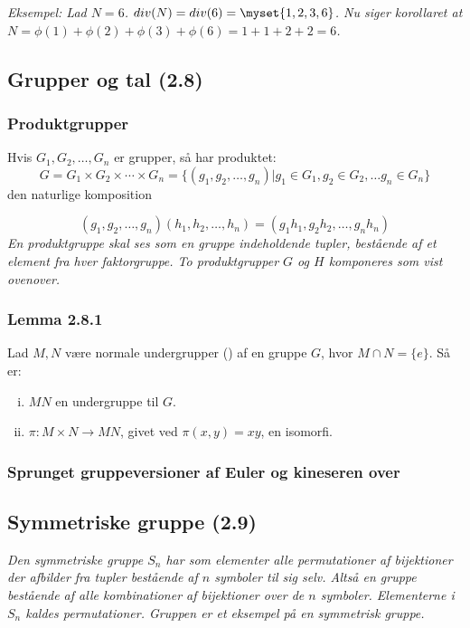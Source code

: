 \textit{Eksempel: Lad $N = 6$. $div(N) = div(6) = \myset{1,2,3,6}$. Nu siger
korollaret at $N = \phi(1) + \phi(2) + \phi(3) + \phi(6) = 1 + 1 + 2 + 2 = 6$.}

\subsection{Grupper og tal (2.8)}
\subsubsection{Produktgrupper}
Hvis $G_1, G_2,\ldots,G_n$ er grupper, så har produktet:
\begin{equation*}
  G = G_1 \times G_2 \times \cdots \times G_n = \{(g_1,g_2,\ldots,g_n) | g_1 \in
  G_1, g_2 \in G_2,\ldots g_n \in G_n \}
\end{equation*}
den naturlige komposition

\begin{equation*}
  (g_1, g_2,\ldots,g_n)(h_1,h_2,\ldots,h_n) = (g_1 h_1,g_2 h_2, \ldots, g_n h_n)
\end{equation*}
\textit{En produktgruppe skal ses som en gruppe indeholdende tupler, bestående
af et element fra hver faktorgruppe. To produktgrupper $G$ og $H$ komponeres
som vist ovenover.}

\subsubsection{Lemma 2.8.1}
Lad $M, N$ være normale undergrupper () af en gruppe $G$, hvor $M
\cap N = \{e\}$. Så er:
\begin{enumerate}[(i)]
  \item $MN$ en undergruppe til $G$.
  \item $\pi: M \times N \rightarrow MN$, givet ved $\pi(x,y) = xy$, en
  isomorfi.
\end{enumerate}

\subsubsection{Sprunget gruppeversioner af Euler og kineseren over}


\subsection{Symmetriske gruppe (2.9)}
\textit{Den symmetriske gruppe $S_n$ har som elementer alle permutationer af
bijektioner der afbilder fra tupler bestående af $n$ symboler til sig selv.
Altså en gruppe bestående af alle kombinationer af bijektioner over de $n$
symboler. Elementerne i $S_n$ kaldes permutationer. Gruppen  er et
eksempel på en symmetrisk gruppe.}

